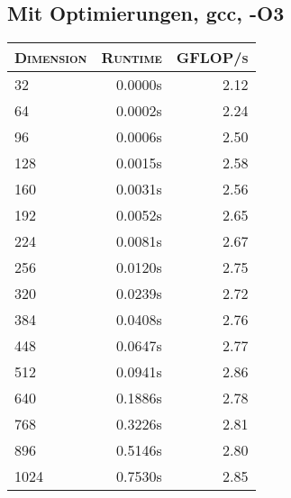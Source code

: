 \begin{table}[!htb]
\begin{minipage}{.5\linewidth}
\subsection{Mit Optimierungen, gcc, -O3}
\begin{tabular}{|l|r|r|}
	\hline
	\textsc{Dimension} & \textsc{Runtime} & \textsc{GFLOP/s} \\
	\hline
	\hline
	32  &  0.0000s  & 2.12 \\ 
	\hline 
	64  &  0.0002s  & 2.24 \\ 
	\hline 
	96  &  0.0006s  & 2.50 \\ 
	\hline 
	128  &  0.0015s  & 2.58 \\ 
	\hline 
	160  &  0.0031s  & 2.56 \\ 
	\hline 
	192  &  0.0052s  & 2.65 \\ 
	\hline 
	224  &  0.0081s  & 2.67 \\ 
	\hline 
	256  &  0.0120s  & 2.75 \\ 
	\hline 
	320  &  0.0239s  & 2.72 \\ 
	\hline 
	384  &  0.0408s  & 2.76 \\ 
	\hline 
	448  &  0.0647s  & 2.77 \\ 
	\hline 
	512  &  0.0941s  & 2.86 \\ 
	\hline 
	640  &  0.1886s  & 2.78 \\ 
	\hline 
	768  &  0.3226s  & 2.81 \\ 
	\hline 
	896  &  0.5146s  & 2.80 \\ 
	\hline 
	1024  &  0.7530s  & 2.85 \\ 
	\hline 
\end{tabular}
\end{minipage}%
\end{table}


